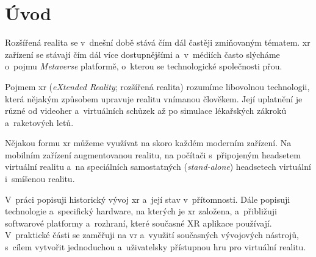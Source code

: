 \chapter*{Úvod}
Rozšířená realita se v~dnešní době stává čím dál častěji zmiňovaným tématem. \gls{xr} zařízení se stávají čím dál více dostupnějšími a~v~médiích často slýcháme o~pojmu \textit{Metaverse} \poml platformě, o~kterou se technologické společnosti přou.

Pojmem \gls{xr} (\textit{eXtended Reality}; rozšířená realita) rozumíme libovolnou technologii, která nějakým způsobem upravuje realitu vnímanou člověkem. Její uplatnění je různé \poml od videoher a~virtuálních schůzek až po simulace lékařských zákroků a~raketových letů. \cite{muni_kybernetika}

Nějakou formu \gls{xr} můžeme využívat na skoro každém moderním zařízení. Na mobilním zařízení augmentovanou realitu, na počítači s~připojeným headsetem virtuální realitu a~na speciálních samostatných (\textit{stand-alone}) headsetech virtuální i~smíšenou realitu.

V~práci popisuji historický vývoj \gls{xr} a~její stav v~přítomnosti. Dále popisuji technologie a~specifický hardware, na kterých je \gls{xr} založena, a~přibližuji softwarové platformy a~rozhraní, které současné XR aplikace používají. V~praktické části se zaměřuji na \gls{vr} a~využití současných vývojových nástrojů, s~cílem vytvořit jednoduchou a~uživatelsky přístupnou hru pro virtuální realitu.